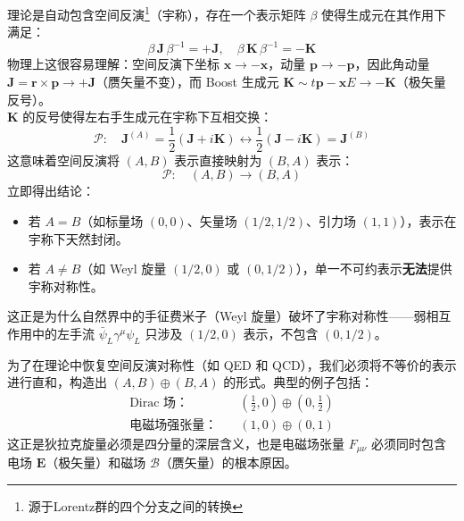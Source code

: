 理论是自动包含空间反演\footnote{源于Lorentz群的四个分支之间的转换}（宇称），存在一个表示矩阵 $\beta$ 使得生成元在其作用下满足：
\begin{equation}
    \beta\,\boldsymbol{J}\,\beta^{-1} = +\boldsymbol{J},\quad \beta\,\boldsymbol{K}\,\beta^{-1} = -\boldsymbol{K}
\end{equation}
物理上这很容易理解：空间反演下坐标 $\mathbf{x}\to-\mathbf{x}$，动量 $\mathbf{p}\to-\mathbf{p}$，因此角动量 $\boldsymbol{J}=\mathbf{r}\times\mathbf{p}\to+\boldsymbol{J}$（赝矢量不变），而 Boost 生成元 $\boldsymbol{K}\sim t\mathbf{p}-\mathbf{x}E\to-\boldsymbol{K}$（极矢量反号）。
\vspace{2ex}\\
$\boldsymbol{K}$ 的反号使得左右手生成元在宇称下互相交换：
\begin{equation}
    \mathcal{P}:\quad \boldsymbol{J}^{(A)}=\frac{1}{2}(\boldsymbol{J}+i\boldsymbol{K}) \longleftrightarrow \frac{1}{2}(\boldsymbol{J}-i\boldsymbol{K})=\boldsymbol{J}^{(B)}
\end{equation}
这意味着空间反演将 $(A,B)$ 表示直接映射为 $(B,A)$ 表示：
\begin{equation}
    \mathcal{P}:\quad (A,B) \longrightarrow (B,A)
\end{equation}
立即得出结论：
\begin{itemize}
    \item 若 $A=B$（如标量场 $(0,0)$、矢量场 $(1/2,1/2)$、引力场 $(1,1)$），表示在宇称下天然封闭。
    \item 若 $A\neq B$（如 Weyl 旋量 $(1/2,0)$ 或 $(0,1/2)$），单一不可约表示\textbf{无法}提供宇称对称性。
\end{itemize}

这正是为什么自然界中的手征费米子（Weyl 旋量）破坏了宇称对称性——弱相互作用中的左手流 $\bar{\psi}_L\gamma^\mu\psi_L$ 只涉及 $(1/2,0)$ 表示，不包含 $(0,1/2)$。

为了在理论中恢复空间反演对称性（如 QED 和 QCD），我们必须将不等价的表示进行直和，构造出 $(A,B)\oplus(B,A)$ 的形式。典型的例子包括：
\begin{align}
    \text{Dirac 场：}\quad &\left(\frac{1}{2},0\right)\oplus\left(0,\frac{1}{2}\right) \\
    \text{电磁场强张量：}\quad &(1,0)\oplus(0,1)
\end{align}
这正是狄拉克旋量必须是四分量的深层含义，也是电磁场张量 $F_{\mu\nu}$ 必须同时包含电场 $\mathbf{E}$（极矢量）和磁场 $\boldsymbol{\mathcal{B}}$（赝矢量）的根本原因。

